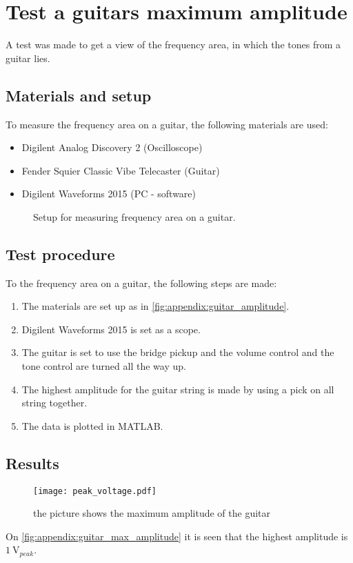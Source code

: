 \chapter{Test a guitars maximum amplitude}\label{app:guitar_max_amplitude}
A test was made to get a view of the frequency area, in which the tones from a guitar lies.

\section*{Materials and setup}
To measure the frequency area on a guitar, the following materials are used:
\begin{itemize}
\item Digilent Analog Discovery 2 (Oscilloscope)
\item Fender Squier Classic Vibe Telecaster (Guitar)
\item Digilent Waveforms 2015 (PC - software)
\end{itemize}

\begin{figure}[htbp!]
\centering
\def\svgwidth{\columnwidth}

\caption{Setup for measuring frequency area on a guitar.}
		\label{fig:appendix:guitar_amplitude}
\end{figure}

\section*{Test procedure}
To the frequency area on a guitar, the following steps are made:
\begin{enumerate}
\item The materials are set up as in \autoref{fig:appendix:guitar_amplitude}.
\item Digilent Waveforms 2015 is set as a scope. 
\item The guitar is set to use the bridge pickup and the volume control and the tone control are turned all the way up.
\item The highest amplitude for the guitar string is made by using a pick on all string together.
\item The data is plotted in MATLAB.
\end{enumerate}

\section*{Results}

\begin{figure}[htbp!]
	\centering
		\texttt{[image: peak\_voltage.pdf]}
		\caption{the picture shows the maximum amplitude of the guitar}
		\label{fig:appendix:guitar_max_amplitude}
\end{figure}

On  \autoref{fig:appendix:guitar_max_amplitude} it is seen that the highest amplitude is $\SI{1}{\volt}_{peak}$.

